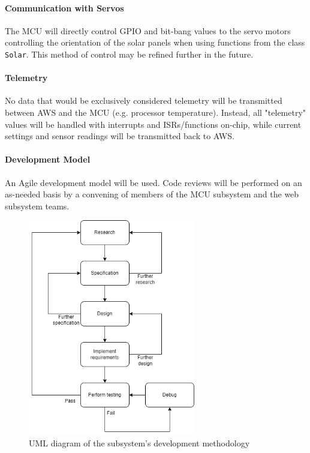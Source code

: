 \paragraph{Communication with Servos}
The MCU will directly control GPIO and bit-bang values to the servo motors
controlling the orientation of the solar panels when using functions from
the class \texttt{Solar}. This method of control may be refined further in
the future.

\paragraph{Telemetry}
No data that would be exclusively considered telemetry will be transmitted 
between AWS and the MCU (e.g. processor temperature). Instead, all
"telemetry" values will be handled with interrupts and ISRs/functions
on-chip, while current settings and sensor readings will be transmitted
back to AWS.

\paragraph{Development Model}
An Agile development model will be used. Code reviews will be performed on
an as-needed basis by a convening of members of the MCU subsystem and the
web subsystem teams.
\begin{figure}[H]
    \caption{UML diagram of the subsystem's development methodology}
    \label{mcu_agile_uml}
    \centering
    \includegraphics[width=0.65\textwidth]{images/mcu_agile_uml.png}
\end{figure}

